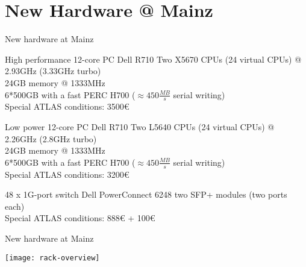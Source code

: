 \section{New Hardware @ Mainz}
\begin{frame}{New hardware at Mainz}{}
	\begin{block}{High performance 12-core PC Dell R710}
		Two X5670 CPUs (24 virtual CPUs) @ 2.93GHz (3.33GHz turbo) \\
		24GB memory @ 1333MHz\\
		6*500GB with a fast PERC H700 ($\approx 450\frac{MB}{s}$ serial writing)\\
		Special ATLAS conditions: 3500€ 			
	\end{block}
	
	\begin{block}{Low power 12-core PC Dell R710}
		Two L5640 CPUs (24 virtual CPUs) @ 2.26GHz (2.8GHz turbo)\\
		24GB memory @ 1333MHz\\
		6*500GB with a fast PERC H700 ($\approx 450\frac{MB}{s}$ serial writing)\\
		Special ATLAS conditions: 3200€ 			
	\end{block}

	\begin{block}{48 x 1G-port switch Dell PowerConnect 6248}
		two SFP+ modules (two ports each)\\
		Special ATLAS conditions: 888€ + 100€ 
	\end{block}
\end{frame}

\begin{frame}{New hardware at Mainz}{}
	\begin{center} 
		\texttt{[image: rack-overview]}
	\end{center} 
\end{frame}

